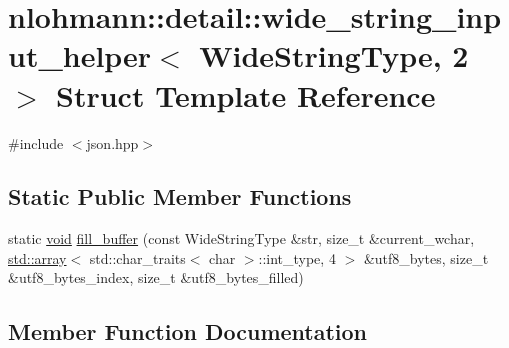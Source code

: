 \hypertarget{structnlohmann_1_1detail_1_1wide__string__input__helper_3_01_wide_string_type_00_012_01_4}{}\section{nlohmann\+::detail\+::wide\+\_\+string\+\_\+input\+\_\+helper$<$ Wide\+String\+Type, 2 $>$ Struct Template Reference}
\label{structnlohmann_1_1detail_1_1wide__string__input__helper_3_01_wide_string_type_00_012_01_4}


{\ttfamily \#include $<$json.\+hpp$>$}

\subsection*{Static Public Member Functions}
\begin{DoxyCompactItemize}
\item 
static \mbox{\hyperlink{namespacenlohmann_1_1detail_a59fca69799f6b9e366710cb9043aa77d}{void}} \mbox{\hyperlink{structnlohmann_1_1detail_1_1wide__string__input__helper_3_01_wide_string_type_00_012_01_4_a7ede7749f186f1a6a46c08abb607fd5c}{fill\+\_\+buffer}} (const Wide\+String\+Type \&str, size\+\_\+t \&current\+\_\+wchar, \mbox{\hyperlink{namespacenlohmann_1_1detail_a1ed8fc6239da25abcaf681d30ace4985af1f713c9e000f5d3f280adbd124df4f5}{std\+::array}}$<$ std\+::char\+\_\+traits$<$ char $>$\+::int\+\_\+type, 4 $>$ \&utf8\+\_\+bytes, size\+\_\+t \&utf8\+\_\+bytes\+\_\+index, size\+\_\+t \&utf8\+\_\+bytes\+\_\+filled)
\end{DoxyCompactItemize}


\subsection{Member Function Documentation}
\mbox{\label{structnlohmann_1_1detail_1_1wide__string__input__helper_3_01_wide_string_type_00_012_01_4_a7ede7749f186f1a6a46c08abb607fd5c}} 
